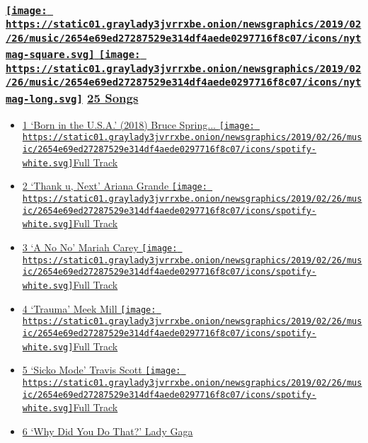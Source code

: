 \hypertarget{--25-songs}{%
\subsubsection[ \protect\hyperlink{ux2f}{25
Songs}]{\texorpdfstring{\href{http://www.nytimes3xbfgragh.onion/magazine}{\protect\texttt{[image: https://static01.graylady3jvrrxbe.onion/newsgraphics/2019/02/26/music/2654e69ed27287529e314df4aede0297716f8c07/icons/nytmag-square.svg]}
\protect\texttt{[image: https://static01.graylady3jvrrxbe.onion/newsgraphics/2019/02/26/music/2654e69ed27287529e314df4aede0297716f8c07/icons/nytmag-long.svg]}}
\protect\hyperlink{ux2f}{25 Songs}}{  25 Songs}}\label{--25-songs}}

\begin{itemize}
\tightlist
\item
  \protect\hyperlink{ux2fbruce-springsteen}{1 `Born in the U.S.A.'
  (2018) Bruce Spring... }
  \href{https://open.spotify.com/track/6TGhSdj9CaXcxTHLjbNNYL}{\texttt{[image: https://static01.graylady3jvrrxbe.onion/newsgraphics/2019/02/26/music/2654e69ed27287529e314df4aede0297716f8c07/icons/spotify-white.svg]}Full
  Track}
\item
  \protect\hyperlink{ux2fariana-grande}{2 `Thank u, Next' Ariana Grande
  }
  \href{https://open.spotify.com/track/3e9HZxeyfWwjeyPAMmWSSQ}{\texttt{[image: https://static01.graylady3jvrrxbe.onion/newsgraphics/2019/02/26/music/2654e69ed27287529e314df4aede0297716f8c07/icons/spotify-white.svg]}Full
  Track}
\item
  \protect\hyperlink{ux2fmariah-carey}{3 `A No No' Mariah Carey }
  \href{https://open.spotify.com/track/7qg349cIMHC1syfpyQZtJ4}{\texttt{[image: https://static01.graylady3jvrrxbe.onion/newsgraphics/2019/02/26/music/2654e69ed27287529e314df4aede0297716f8c07/icons/spotify-white.svg]}Full
  Track}
\item
  \protect\hyperlink{ux2fmeek-mill}{4 `Trauma' Meek Mill }
  \href{https://open.spotify.com/track/45CCe4gu08OYG1I4MH8TU6}{\texttt{[image: https://static01.graylady3jvrrxbe.onion/newsgraphics/2019/02/26/music/2654e69ed27287529e314df4aede0297716f8c07/icons/spotify-white.svg]}Full
  Track}
\item
  \protect\hyperlink{ux2ftravis-scott}{5 `Sicko Mode' Travis Scott }
  \href{https://open.spotify.com/track/2xLMifQCjDGFmkHkpNLD9h}{\texttt{[image: https://static01.graylady3jvrrxbe.onion/newsgraphics/2019/02/26/music/2654e69ed27287529e314df4aede0297716f8c07/icons/spotify-white.svg]}Full
  Track}
\item
  \protect\hyperlink{ux2flady-gaga}{6 `Why Did You Do That?' Lady Gaga }

\end{itemize}

